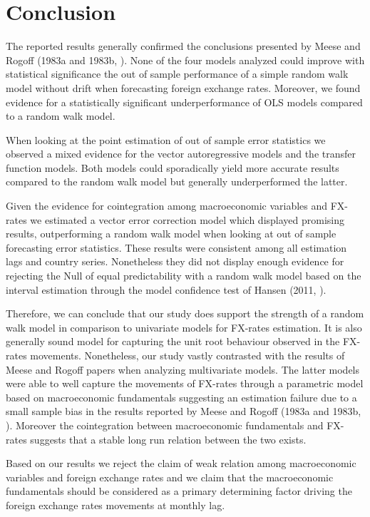 \section{Conclusion}
\label{sec:conclusion}

The reported results generally confirmed the conclusions presented by Meese and Rogoff (1983a and 1983b, \cite{MeeseRogoffa, MeeseRogoffb}).
None of the four models analyzed could improve with statistical significance the out of sample performance of a simple random walk 
model without drift when forecasting foreign exchange rates. Moreover, we found evidence for a statistically significant underperformance of
OLS models compared to a random walk model.  

When looking at the point estimation of out of sample error statistics we observed a mixed evidence for the vector autoregressive models and the
transfer function models. Both models could sporadically yield more accurate results compared to the random walk model but generally underperformed
the latter.

Given the evidence for cointegration among macroeconomic variables and FX-rates we estimated a vector error correction model which displayed promising
results, outperforming a random walk model when looking at out of sample forecasting error statistics. These results were consistent
among all estimation lags and country series. Nonetheless they did not display enough evidence for rejecting the Null of equal predictability with a
random walk model based on the interval estimation through the model confidence test of Hansen (2011, \cite{HansenMCS}).

Therefore, we can conclude that our study does support the strength of a random walk model in comparison to univariate models
for FX-rates estimation. It is also generally sound model for capturing the unit root behaviour observed in the FX-rates movements. Nonetheless, our study
vastly contrasted with the results of Meese and Rogoff papers when analyzing multivariate models. The latter models were able to well capture the
movements of FX-rates through a parametric model based on macroeconomic fundamentals suggesting an estimation failure due to a small sample bias
in the results reported by Meese and Rogoff (1983a and 1983b, \cite{MeeseRogoffa, MeeseRogoffb}). Moreover the cointegration between macroeconomic
fundamentals and FX-rates suggests that a stable long run relation between the two exists.

Based on our results we reject the claim of weak relation among macroeconomic variables and foreign exchange rates and we claim that the
macroeconomic fundamentals should be considered as a primary determining factor driving the foreign exchange rates movements at monthly lag.

